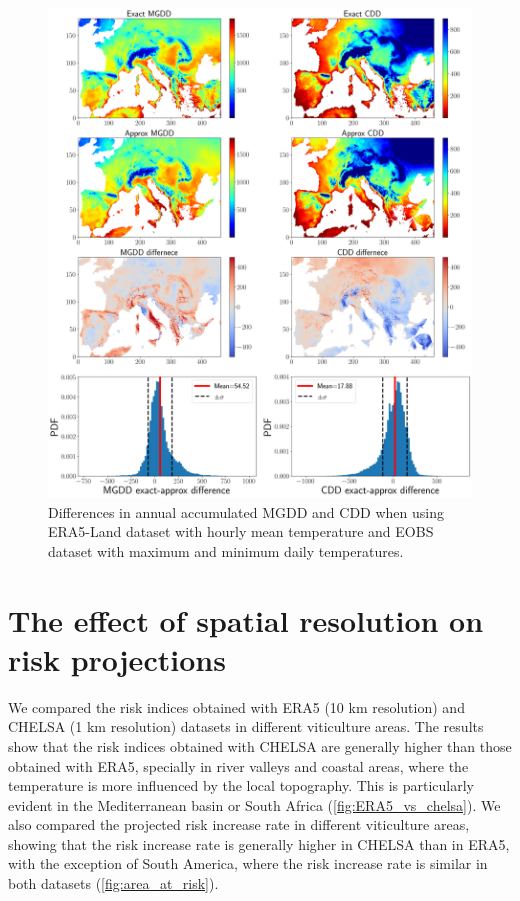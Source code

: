 \begin{figure}[H]
    \centering
    \includegraphics[width=\textwidth]{Figures/E-OBS_vs_ERA5.pdf}
    \caption[Comparison of annual cumulative MGDD and CDD using hourly and
        daily temperature data]{Differences in annual accumulated MGDD and CDD
        when
        using
        ERA5-Land dataset with hourly mean temperature and EOBS dataset with
        maximum
        and minimum daily temperatures.}
    \label{fig:EOBS_vs_ERA5}
\end{figure}

\section{The effect of spatial resolution on risk projections}

We compared the risk indices obtained with ERA5 (10 km resolution) and CHELSA
(1 km resolution) datasets in different viticulture areas. The results show
that the risk indices obtained with CHELSA are generally higher than those
obtained with ERA5, specially in river valleys and coastal areas, where the
temperature is more influenced by the local topography. This is particularly
evident in the Mediterranean basin or South Africa (\cref{fig:ERA5_vs_chelsa}).
We also compared the projected risk increase rate in different viticulture
areas, showing that the risk increase rate is generally higher in CHELSA than
in ERA5, with the exception of South America, where the risk increase rate is
similar in both datasets (\cref{fig:area_at_risk}).

